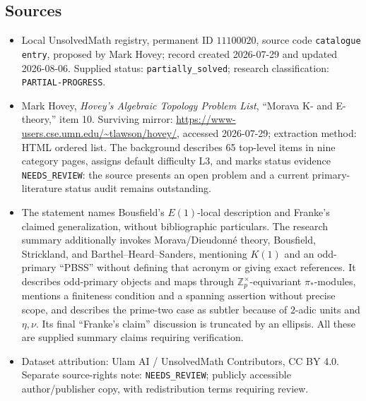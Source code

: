 \documentclass[11pt]{article}
\newcommand{\Z}{\mathbb{Z}}
\begin{document}
\subsection{Sources}
\begin{itemize}
\item Local UnsolvedMath registry, permanent ID $11100020$, source code \texttt{catalogue entry}, proposed by Mark Hovey; record created 2026-07-29 and updated 2026-08-06. Supplied status: \texttt{partially\_solved}; research classification: \texttt{PARTIAL-PROGRESS}.
\item Mark Hovey, \emph{Hovey's Algebraic Topology Problem List}, ``Morava K- and E-theory,'' item 10. Surviving mirror: \url{https://www-users.cse.umn.edu/~tlawson/hovey/}, accessed 2026-07-29; extraction method: HTML ordered list. The background describes 65 top-level items in nine category pages, assigns default difficulty L3, and marks status evidence \texttt{NEEDS\_REVIEW}: the source presents an open problem and a current primary-literature status audit remains outstanding.
\item The statement names Bousfield's $E(1)$-local description and Franke's claimed generalization, without bibliographic particulars. The research summary additionally invokes Morava/Dieudonn\'e theory, Bousfield, Strickland, and Barthel--Heard--Sanders, mentioning $K(1)$ and an odd-primary ``PBSS'' without defining that acronym or giving exact references. It describes odd-primary objects and maps through $\Z_p^{\times}$-equivariant $\pi_*$-modules, mentions a finiteness condition and a spanning assertion without precise scope, and describes the prime-two case as subtler because of $2$-adic units and $\eta,\nu$. Its final ``Franke's claim'' discussion is truncated by an ellipsis. All these are supplied summary claims requiring verification.
\item Dataset attribution: Ulam AI / UnsolvedMath Contributors, CC BY 4.0. Separate source-rights note: \texttt{NEEDS\_REVIEW}; publicly accessible author/publisher copy, with redistribution terms requiring review.
\end{itemize}
\end{document}

